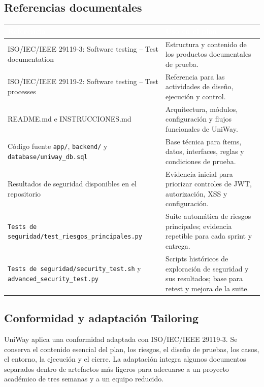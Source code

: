 \documentclass[11pt,a4paper]{article}
\newcommand{\thead}[1]{\textcolor{white}{\textbf{#1}}}
\begin{document}
\subsection{Referencias documentales}
\begin{tabularx}{\textwidth}{p{5.0cm}Y}
\thead{Referencia} & \thead{Uso en el plan}\\
\midrule
ISO/IEC/IEEE 29119-3: Software testing -- Test documentation & Estructura y contenido de los productos documentales de prueba.\\
ISO/IEC/IEEE 29119-2: Software testing -- Test processes & Referencia para las actividades de diseño, ejecución y control.\\
README.md e INSTRUCCIONES.md & Arquitectura, módulos, configuración y flujos funcionales de UniWay.\\
Código fuente \texttt{app/}, \texttt{backend/} y \texttt{database/uniway\_db.sql} & Base técnica para ítems, datos, interfaces, reglas y condiciones de prueba.\\
Resultados de seguridad disponibles en el repositorio & Evidencia inicial para priorizar controles de JWT, autorización, XSS y configuración.\\
\texttt{Tests de seguridad/test\_riesgos\_principales.py} & Suite automática de riesgos principales; evidencia repetible para cada sprint y entrega.\\
\texttt{Tests de seguridad/security\_test.sh} y \texttt{advanced\_security\_test.py} & Scripts históricos de exploración de seguridad y sus resultados; base para retest y mejora de la suite.\\
\end{tabularx}

\subsection{Conformidad y adaptación Tailoring}
UniWay aplica una conformidad adaptada con ISO/IEC/IEEE 29119-3. Se conserva el contenido esencial del plan, los riesgos, el diseño de pruebas, los casos, el entorno, la ejecución y el cierre. La adaptación integra algunos documentos separados dentro de artefactos más ligeros para adecuarse a un proyecto académico de tres semanas y a un equipo reducido.
\end{document}
